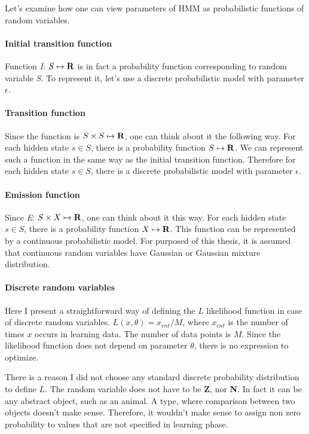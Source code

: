 \documentclass[thesis=B,english]{FITthesis}[2012/06/26]
\begin{document}
Let's examine how one can view parameters of HMM as probabilistic functions of random variables.

\paragraph{Initial transition function}

Function \emph{I}: $S \mapsto \textbf R$ is in fact a probability function corresponding to random variable \emph{S}. To represent it, let's use a discrete probabilistic model with parameter $\epsilon$.

\paragraph{Transition function}

Since the function is $S \times S \mapsto \textbf R$, one can think about it the following way. For each hidden state $s \in S$, there is a probability function $S \mapsto \textbf R$. We can represent such a function in the same way as the initial transition function. Therefore for each hidden state $s \in S$, there is a discrete probabilistic model with parameter $\epsilon$.

\paragraph{Emission function}

Since \emph{E}: $S \times X \mapsto \textbf R$, one can think about it this way. For each hidden state $s \in S$, there is a probability function $X \mapsto \textbf R$. This function can be represented by a continuous probabilistic model. For purposed of this thesis, it is assumed that continuous random variables have Gaussian or Gaussian mixture distribution.

\paragraph{Discrete random variables}

Here I present a straightforward way of defining the $L$ likelihood function in case of discrete random variables. $L(x,\theta) = x_{cnt} / M$, where $x_{cnt}$ is the number of times $x$ occurs in learning data. The number of data points is $M$. Since the likelihood function does not depend on parameter $\theta$, there is no expression to optimize.

There is a reason I did not choose any standard discrete probability distribution to define $L$. The random variable does not have to be \textbf Z, nor \textbf N. In fact it can be any abstract object, such as an animal. A type, where comparison between two objects doesn't make sense. Therefore, it wouldn't make sense to assign non zero probability to values that are not specified in learning phase.
\end{document}
